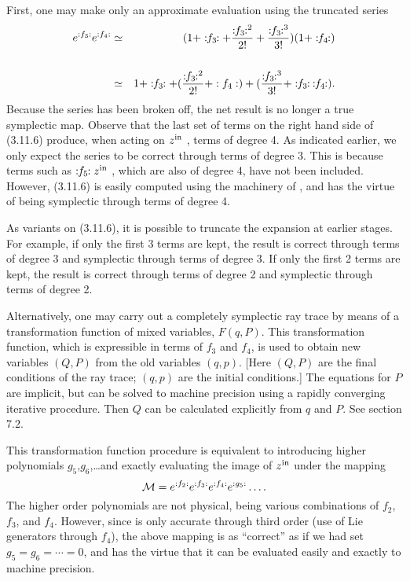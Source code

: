      First, one may make only an approximate evaluation using the truncated
series
\begin{eqnarray}
   e^{:f_3:} e^{:f_4:} & \simeq & (1 + \Lieop(f_3) + \frac {\Lieop(f_3)^2}{2!} + \frac {\Lieop(f_3)^{3}}{3!})(1 + \Lieop(f_4))\\
   &        &  \nonumber             \\
   & \simeq & 1 + \Lieop(f_3) + (\frac {\Lieop(f_3)^2}{2!} + :f_4:) + (\frac {\Lieop(f_3)^{3}}{3!} + \Lieop(f_3)\:\Lieop(f_4) ).
\end{eqnarray}
Because the series has been broken off, the net result is no longer a true
symplectic map.  Observe that the last set of terms on the right hand side
of (3.11.6) produce, when acting on $z^{\mbox{\scriptsize in}}$  , terms of degree 4.  As indicated earlier, we only expect the series to be correct through terms of degree 3.
This is because terms such as $\Lieop(f_5) z^{\mbox{\scriptsize in}}$  ,
which are also of degree 4, have not been included.  However, (3.11.6)
is easily computed using the machinery of , and has the virtue of being symplectic through terms of
degree 4.

     As variants on (3.11.6), it is possible to truncate the expansion at
earlier stages.  For example, if only the first 3 terms are kept, the
result is correct through terms of degree 3 and symplectic through terms of
degree 3. If only the first 2 terms are kept, the result is correct through
terms of degree 2 and symplectic through terms of degree 2.

     Alternatively, one may carry out a completely symplectic ray trace by
means of a transformation function of mixed variables, $F(q,P)$.  This
transformation function, which is expressible in terms of $f_3$  and $f_4$, is
used to obtain new variables $(Q,P)$ from the old variables $(q,p)$.  [Here
$(Q,P)$ are the final conditions of the ray trace; $(q,p)$ are the initial
conditions.]  The equations for $P$ are implicit, but can be solved to
machine precision using a rapidly converging iterative procedure.  Then $Q$
can be calculated explicitly from $q$ and $P$.  See section 7.2.

     This transformation function procedure is equivalent to introducing higher polynomials
$g_5$,$g_6$,\ldots and exactly evaluating the image of $z^{\mbox{\scriptsize in}}$   under the mapping
\begin{equation}
     {\cal M} = e^{:f_2:} e^{:f_3:} e^{:f_4:} e^{:g_5:} \ldots.
\end{equation}
The higher order polynomials are not physical, being various combinations
of $f_2$, $f_3$, and $f_4$.  However, since \Mary is only accurate through third
order (use of Lie generators through $f_4$), the above mapping is as ``correct'' as if we had set $g_5 = g_6 = \cdots = 0$, and has the virtue that it can be evaluated easily and exactly to machine precision.

